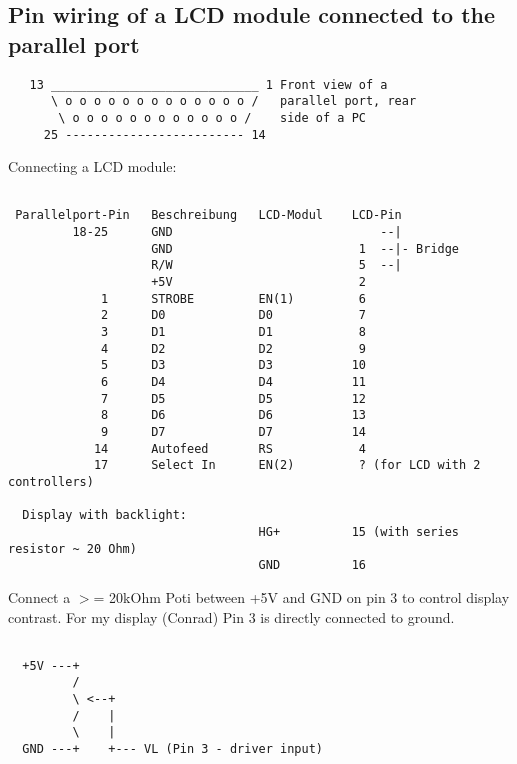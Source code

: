 \subsection{Pin wiring of a LCD module connected to the parallel port}
 
\begin{example}
\begin{verbatim}
   13 _____________________________ 1 Front view of a 
      \ o o o o o o o o o o o o o /   parallel port, rear
       \ o o o o o o o o o o o o /    side of a PC
     25 ------------------------- 14
\end{verbatim}
\end{example}
   

 Connecting a LCD module:

 
\begin{example}
\begin{verbatim}
 
 Parallelport-Pin   Beschreibung   LCD-Modul    LCD-Pin
         18-25      GND                             --|
                    GND                          1  --|- Bridge
                    R/W                          5  --|
                    +5V                          2
             1      STROBE         EN(1)         6
             2      D0             D0            7
             3      D1             D1            8
             4      D2             D2            9
             5      D3             D3           10
             6      D4             D4           11
             7      D5             D5           12
             8      D6             D6           13
             9      D7             D7           14
            14      Autofeed       RS            4
            17      Select In      EN(2)         ? (for LCD with 2 controllers)

  Display with backlight:
                                   HG+          15 (with series resistor ~ 20 Ohm)
                                   GND          16
\end{verbatim}
\end{example}

  Connect a $>$= 20kOhm Poti between +5V and GND on pin 3 to control display contrast. 
  For my display (Conrad) Pin 3 is directly connected to ground.

\begin{example}
\begin{verbatim}
  
  +5V ---+
         /
         \ <--+
         /    |
         \    |
  GND ---+    +--- VL (Pin 3 - driver input)
\end{verbatim}
\end{example}



